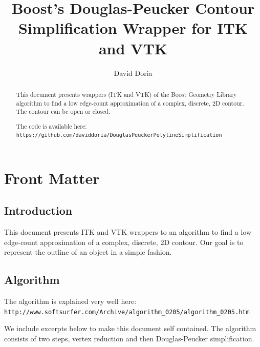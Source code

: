 \documentclass{InsightArticle}
\title{Boost's Douglas-Peucker Contour Simplification Wrapper for ITK and VTK}
\author{David Doria}
\newcommand{\IJhandlerIDnumber}{3302}
\begin{document}
\IJhandlefooter{\IJhandlerIDnumber}


\ifpdf
\else
\fi


\maketitle


\ifhtml
\chapter*{Front Matter\label{front}}
\fi

\begin{abstract}
\noindent

This document presents wrappers (ITK and VTK) of the Boost Geometry Library algorithm to find a low edge-count approximation of a complex, discrete, 2D contour. The contour can be open or closed.

The code is available here:
\verb|https://github.com/daviddoria/DouglasPeuckerPolylineSimplification|

\end{abstract}

\IJhandlenote{\IJhandlerIDnumber}

\tableofcontents
\section{Introduction}
This document presents ITK and VTK wrappers to an algorithm to find a low edge-count approximation of a complex, discrete, 2D  contour. Our goal is to represent the outline of an object in a simple fashion.

\section{Algorithm}
\label{sec:Algorithm}
The algorithm is explained very well here:
\verb|http://www.softsurfer.com/Archive/algorithm_0205/algorithm_0205.htm|

We include excerpts below to make this document self contained. The algorithm consists of two steps, vertex reduction and then Douglas-Peucker simplification.
\end{document}

